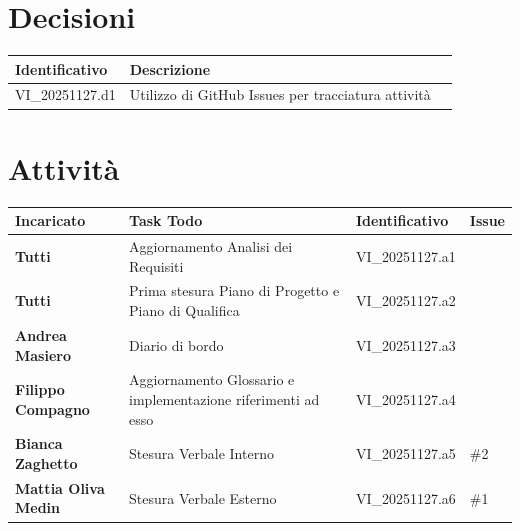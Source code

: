 \documentclass[a4paper,12pt]{article}
\begin{document}
\section{Decisioni} {
    \begin{tabularx}{\textwidth}{|l|X|l|}
        \hline
        \textbf{Identificativo} & \textbf{Descrizione}\\
        \hline
        VI\_20251127.d1 & Utilizzo di GitHub Issues per tracciatura attività\\
        \hline
    \end{tabularx}
}

\section{Attività} {
    \begin{tabularx}{\textwidth}{|l|X|l|l|}
        \hline
        \textbf{Incaricato} & \textbf{Task Todo} & \textbf{Identificativo} & \textbf{Issue}\\
        \hline
        \textbf{Tutti} & Aggiornamento Analisi dei Requisiti & VI\_20251127.a1 & \\
        \hline
        \textbf{Tutti} & Prima stesura Piano di Progetto e Piano di Qualifica & VI\_20251127.a2 & \\
        \hline
        \textbf{Andrea Masiero} & Diario di bordo & VI\_20251127.a3 & \\
        \hline
        \textbf{Filippo Compagno} & Aggiornamento Glossario e implementazione riferimenti ad esso & VI\_20251127.a4 & \\
        \hline
        \textbf{Bianca Zaghetto} & Stesura Verbale Interno & VI\_20251127.a5 & \#2\\
        \hline
        \textbf{Mattia Oliva Medin} & Stesura Verbale Esterno & VI\_20251127.a6 & \#1\\
        \hline
    \end{tabularx}
}
\end{document}
